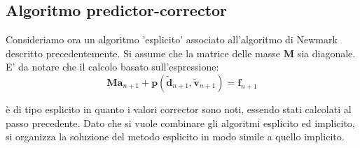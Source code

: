 \subsection{Algoritmo predictor-corrector}

Consideriamo ora un algoritmo 'esplicito' associato all'algoritmo di Newmark descritto precedentemente. 
Si assume che la matrice delle masse $\boldsymbol{M}$ sia diagonale. 
E' da notare che il calcolo basato sull'espressione:
\begin{equation}
	\boldsymbol{M a}_{n+1} + \boldsymbol{p} (\tilde{\boldsymbol{d}}_{n+1}, \tilde{\boldsymbol{v}}_{n+1}) = \boldsymbol{f}_{n+1}
\end{equation}

è di tipo esplicito in quanto i valori corrector sono noti, essendo stati calcolati al passo precedente. Dato che si vuole combinare gli algoritmi esplicito ed implicito, si organizza la soluzione del metodo esplicito in modo simile a quello implicito.

